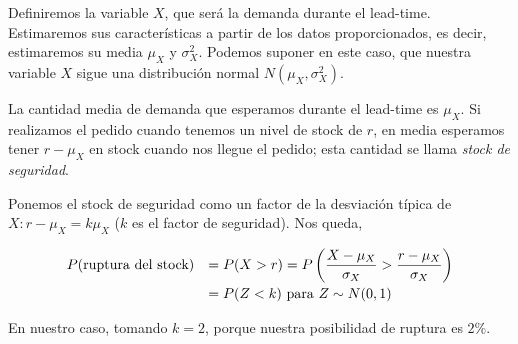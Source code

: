 \documentclass[a4paper,12pt]{article}
\begin{document}
Definiremos la variable $X$, que ser\'a la demanda durante el lead-time. Estimaremos sus caracter\'isticas a partir de los datos proporcionados, es decir, estimaremos su media $\mu_X$ y $\sigma_X^2$. Podemos suponer en este caso, que nuestra variable $X$ sigue una distribuci\'on normal $N(\mu_X, \sigma_X^2)$. 

La cantidad media de demanda que esperamos durante el lead-time es $\mu_X$. Si realizamos el pedido cuando tenemos un nivel de stock de $r$, en media esperamos tener $r - \mu_X$ en stock cuando nos llegue el pedido; esta cantidad se llama \textit{stock de seguridad}. 

Ponemos el stock de seguridad como un factor de la desviaci\'on t\'ipica de $X: r - \mu_X = k\mu_X$ ($k$ es el factor de seguridad). Nos queda,

\begin{equation*}
\begin{array}{l l}
 P(\text{ruptura del stock}) & =  P(X > r) = P\left(\dfrac{X - \mu_X}{\sigma_X} > \dfrac{r-\mu_X}{\sigma_X}\right) \\[0.3cm]
 \, &	= P(Z < k) \text{ para } Z \sim N(0,1)
\end{array}
\end{equation*}

En nuestro caso, tomando $k = 2$, porque nuestra posibilidad de ruptura es $2 \%$.
\end{document}
